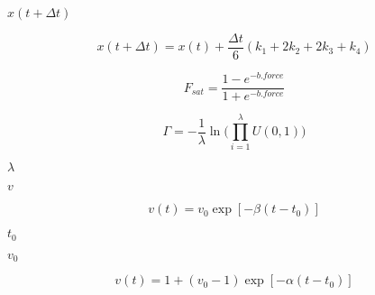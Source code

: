 \documentclass{article}
\begin{document}
$x(t+\Delta t)$
\pagebreak

\begin{equation} x(t+\Delta t) = x(t) + \frac{\Delta t}{6}(k_1 + 2k_2 + 2k_3+k_4) \end{equation}
\pagebreak

\begin{equation} F_{sat} = \frac{1-e^{-b.force}}{1+e^{-b.force}} \end{equation}
\pagebreak

\begin{equation} \Gamma = -\frac{1}{\lambda}\ln(\limits\prod_{i=1}^{\lambda} U(0,1)) \end{equation}
\pagebreak

$\lambda$
\pagebreak

$v$
\pagebreak

\begin{equation} v(t) = v_0\exp[-\beta(t-t_0)] \end{equation}
\pagebreak

$t_0$
\pagebreak

$v_0$
\pagebreak

\begin{equation} v(t) = 1 + (v_0 - 1)\exp[-\alpha(t-t_0)] \end{equation}
\pagebreak
\end{document}
